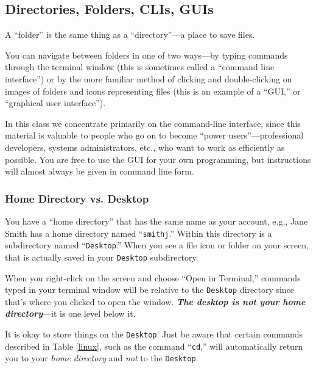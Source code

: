 


\vspace{-0.2in}
\subsection*{Directories, Folders, CLIs, GUIs}
\vspace{-0.1in}
A ``folder'' is the same thing as a ``directory''---a place to save
files. 

\noindent You can navigate
between folders in one of two ways---by typing commands through the
terminal window (this is sometimes called a ``command line
interface'') or by the more familiar method of clicking and double-clicking
on images of folders and icons representing files (this is an example of
a ``GUI,'' or ``graphical user interface''). 

\noindent In this class we concentrate primarily on the command-line interface, since
this material is valuable to people who go on to become 
``power users''---professional
developers, systems administrators, etc., who want to work as
efficiently as possible. You are free to use the GUI
for your own programming, but instructions will almost always
be given in command line form.

\vspace{-0.2in}
\subsubsection*{Home Directory vs. Desktop}
\vspace{-0.1in}
You have a ``home
directory'' that has the same name as your account, e.g., Jane Smith has
a home directory named ``{\tt smithj}.'' Within this directory is
a subdirectory named ``{\tt Desktop}.'' When you see a file icon or folder
on your screen, that is actually saved in your {\tt Desktop}
subdirectory.

\noindent When you right-click on the screen and choose ``Open in Terminal,'' commands
typed in your
terminal window will be relative to the {\tt Desktop} directory since that's 
where you clicked to open the window. \textbf{\textit{The desktop is 
{\em not} your home directory}}---it is one 
level below it.

\noindent It is okay to store things on the {\tt Desktop}. Just be aware that certain
commands described in Table \ref{linux}, such as the command ``{\tt cd},'' 
will automatically return you to your {\em home directory}
and {\em not} to the {\tt Desktop}.

